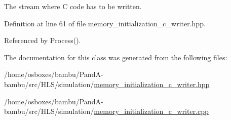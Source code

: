 The stream where C code has to be written. 



Definition at line 61 of file memory\+\_\+initialization\+\_\+c\+\_\+writer.\+hpp.



Referenced by Process().



The documentation for this class was generated from the following files\+:\begin{DoxyCompactItemize}
\item 
/home/osboxes/bambu/\+Pand\+A-\/bambu/src/\+H\+L\+S/simulation/\hyperlink{memory__initialization__c__writer_8hpp}{memory\+\_\+initialization\+\_\+c\+\_\+writer.\+hpp}\item 
/home/osboxes/bambu/\+Pand\+A-\/bambu/src/\+H\+L\+S/simulation/\hyperlink{memory__initialization__c__writer_8cpp}{memory\+\_\+initialization\+\_\+c\+\_\+writer.\+cpp}\end{DoxyCompactItemize}
